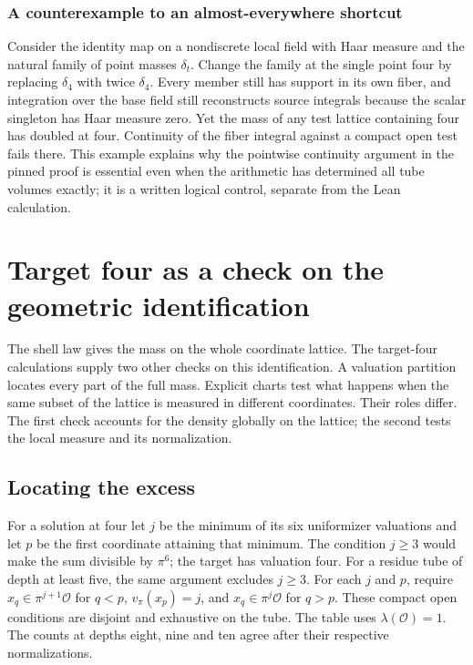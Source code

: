 \documentclass[12pt,letterpaper]{article}
\begin{document}
\subsubsection{A counterexample to an almost-everywhere shortcut}
Consider the identity map on a nondiscrete local field with Haar measure and the natural family of point masses $\delta_t$. Change the family at the single point four by replacing $\delta_4$ with twice $\delta_4$. Every member still has support in its own fiber, and integration over the base field still reconstructs source integrals because the scalar singleton has Haar measure zero. Yet the mass of any test lattice containing four has doubled at four. Continuity of the fiber integral against a compact open test fails there. This example explains why the pointwise continuity argument in the pinned proof is essential even when the arithmetic has determined all tube volumes exactly; it is a written logical control, separate from the Lean calculation.

\section{Target four as a check on the geometric identification}
The shell law gives the mass on the whole coordinate lattice. The target-four calculations supply two other checks on this identification. A valuation partition locates every part of the full mass. Explicit charts test what happens when the same subset of the lattice is measured in different coordinates. Their roles differ. The first check accounts for the density globally on the lattice; the second tests the local measure and its normalization.

\subsection{Locating the excess}
For a solution at four let \(j\) be the minimum of its six uniformizer valuations and let \(p\) be the first coordinate attaining that minimum. The condition \(j\ge3\) would make the sum divisible by \(\pi^6\); the target has valuation four. For a residue tube of depth at least five, the same argument excludes \(j\ge3\). For each \(j\) and \(p\), require \(x_q\in\pi^{j+1}\mathcal O\) for \(q<p\), \(v_\pi(x_p)=j\), and \(x_q\in\pi^j\mathcal O\) for \(q>p\). These compact open conditions are disjoint and exhaustive on the tube. The table uses \(\lambda(\mathcal O)=1\). The counts at depths eight, nine and ten agree after their respective normalizations.
\end{document}
